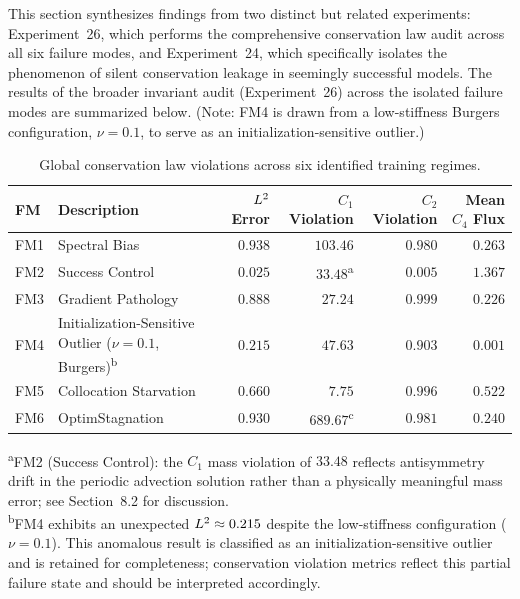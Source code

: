 This section synthesizes findings from two distinct but related experiments: Experiment~26, which performs the comprehensive conservation law audit across all six failure modes, and Experiment~24, which specifically isolates the phenomenon of silent conservation leakage in seemingly successful models. The results of the broader invariant audit (Experiment~26) across the isolated failure modes are summarized below. (Note: FM4 is drawn from a low-stiffness Burgers configuration, $\nu=0.1$, to serve as an initialization-sensitive outlier.)

\begin{table}[htpb]
    \centering
    \caption{Global conservation law violations across six identified training regimes.}
    \label{tab:exp26_conservation}
    \begin{tabular}{@{}llrrrr@{}}
        \toprule
        FM & Description & $L^2$ Error & $C_1$ Violation & $C_2$ Violation & Mean $C_4$ Flux \\
        \midrule
        FM1 & Spectral Bias & $0.938$ & $103.46$ & $0.980$ & $0.263$ \\
        FM2 & Success Control & $0.025$ & $33.48$\textsuperscript{a} & $0.005$ & $1.367$ \\
        FM3 & Gradient Pathology & $0.888$ & $27.24$ & $0.999$ & $0.226$ \\
        FM4 & Initialization-Sensitive Outlier ($\nu=0.1$, Burgers)\textsuperscript{b} & $0.215$ & $47.63$ & $0.903$ & $0.001$ \\
        FM5 & Collocation Starvation & $0.660$ & $7.75$ & $0.996$ & $0.522$ \\
        FM6 & OptimStagnation & $0.930$ & $689.67$\textsuperscript{c} & $0.981$ & $0.240$ \\
        \bottomrule
    \end{tabular}
    \begin{flushleft}
    \textsuperscript{a}FM2 (Success Control): the $C_1$ mass violation of $33.48$ reflects antisymmetry drift in the periodic advection solution rather than a physically meaningful mass error; see Section~8.2 for discussion.\\
    \textsuperscript{b}FM4 exhibits an unexpected $L^2 \approx 0.215$ despite the low-stiffness configuration ($\nu=0.1$). This anomalous result is classified as an initialization-sensitive outlier and is retained for completeness; conservation violation metrics reflect this partial failure state and should be interpreted accordingly.\\

\end{flushleft}
\end{table}
